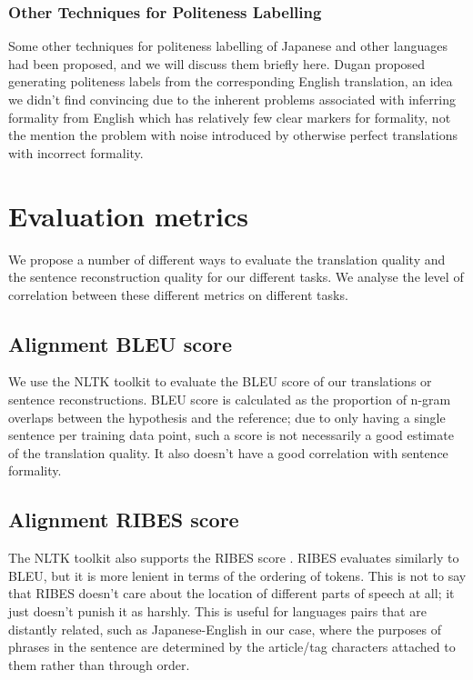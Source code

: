 \documentclass[11pt]{article}
\begin{document}
\subsubsection{Other Techniques for Politeness Labelling}

Some other techniques for politeness labelling of Japanese and other languages had been proposed, and we will discuss them briefly here. Dugan \cite{Dugan:20} proposed generating politeness labels from the corresponding English translation, an idea we didn't find convincing due to the inherent problems associated with inferring formality from English which has relatively few clear markers for formality, not the mention the problem with noise introduced by otherwise perfect translations with incorrect formality.

\section{Evaluation metrics}

We propose a number of different ways to evaluate the translation quality and the sentence reconstruction quality for our different tasks. We analyse the level of correlation between these different metrics on different tasks.

\subsection{Alignment BLEU score}

We use the NLTK toolkit \cite{NLTK} to evaluate the BLEU score \cite{10.3115/1073083.1073135} of our translations or sentence reconstructions. BLEU score is calculated as the proportion of n-gram overlaps between the hypothesis and the reference; due to only having a single sentence per training data point, such a score is not necessarily a good estimate of the translation quality. It also doesn't have a good correlation with sentence formality.

\subsection{Alignment RIBES score}

The NLTK toolkit also supports the RIBES score \cite{isozaki-etal-2010-automatic}. RIBES evaluates similarly to BLEU, but it is more lenient in terms of the ordering of tokens. This is not to say that RIBES doesn't care about the location of different parts of speech at all; it just doesn't punish it as harshly. This is useful for languages pairs that are distantly related, such as Japanese-English in our case, where the purposes of phrases in the sentence are determined by the article/tag characters attached to them rather than through order. 
\end{document}
